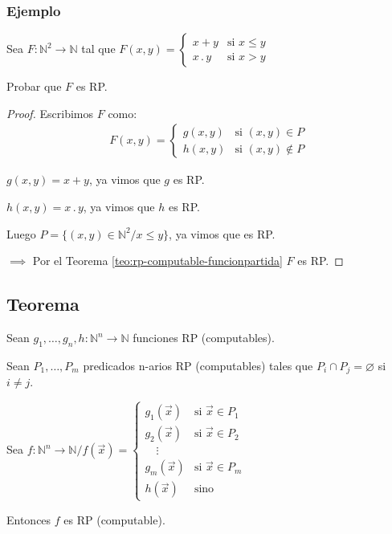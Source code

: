 \subsubsection{Ejemplo}

Sea $F: \mathbb{N}^2 \to \mathbb{N}$ tal que $F(x,y) = \begin{cases}
    x+y & \text{si } x \leq y \\
    x\, . \, y & \text{si } x > y 
\end{cases}$

Probar que $F$ es RP.

\begin{proof} \phantom{.}

    Escribimos $F$ como:
    \begin{gather*}
        F(x,y) = 
        \begin{cases}
            g(x,y) & \text{si } (x,y) \in {P}\\
            h(x,y) & \text{si } (x,y) \notin {P}
        \end{cases}
    \end{gather*}

    $g(x,y) = x+y$, ya vimos que $g$ es RP.

    $h(x,y) = x \, . \, y$, ya vimos que $h$ es RP.

    Luego $P = \{ (x,y) \in \mathbb{N}^2 / x \leq y \}$, ya vimos que es RP.

    $\implies$ Por el Teorema \ref{teo:rp-computable-funcionpartida} $F$ es RP.
\end{proof}

\subsection{Teorema}

\begin{teorema}{}{}
    Sean $g_1, \dotsc, g_n,h : \mathbb{N}^n \to \mathbb{N}$ funciones RP
    (computables).

    Sean $P_1, \dotsc, P_m$ predicados n-arios RP (computables) tales que
    $P_i \cap P_j = \varnothing$ si $i \neq j$.

    Sea $f: \mathbb{N}^n \to \mathbb{N} / f(\overrightarrow{x}) =
    \begin{cases}
        g_1(\overrightarrow{x}) & \text{si } \overrightarrow{x} \in P_1 \\
        g_2(\overrightarrow{x}) & \text{si } \overrightarrow{x} \in P_2 \\
        \quad \vdots & \\
        g_m(\overrightarrow{x}) & \text{si } \overrightarrow{x} \in P_m \\
        h(\overrightarrow{x}) & \text{sino}
    \end{cases}$

    \medskip

    Entonces $f$ es RP (computable).
\end{teorema}

